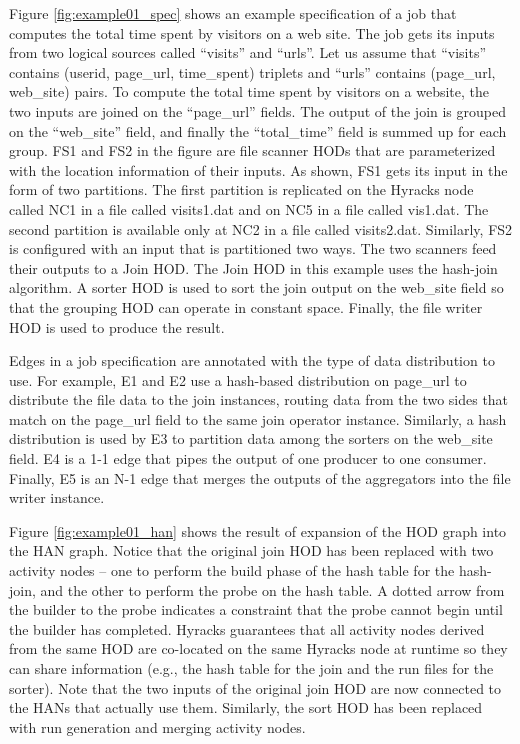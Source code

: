 {Figure \ref{fig:example01_spec} shows an example specification of a job that computes the total time spent by visitors on a web site. The job gets its inputs from two logical sources called ``visits'' and ``urls''. Let us assume that ``visits'' contains (userid, page\_url, time\_spent) triplets and ``urls'' contains (page\_url, web\_site) pairs. To compute the total time spent by visitors on a website, the two inputs are joined on the ``page\_url'' fields. The output of the join is grouped on the ``web\_site'' field, and finally the ``total\_time'' field is summed up for each group. FS1 and FS2 in the figure are file scanner HODs that are parameterized with the location information of their inputs. As shown, FS1 gets its input in the form of two partitions. The first partition is replicated on the Hyracks node called NC1 in a file called visits1.dat and on NC5 in a file called vis1.dat. The second partition is available only at NC2 in a file called visits2.dat. Similarly, FS2 is configured with an input that is partitioned two ways. The two scanners feed their outputs to a Join HOD. The Join HOD in this example uses the hash-join algorithm. A sorter HOD is used to sort the join output on the web\_site field so that the grouping HOD can operate in constant space. Finally, the file writer HOD is used to produce the result.

Edges in a job specification are annotated with the type of data distribution to use. For example, E1 and E2 use a hash-based distribution on page\_url to distribute the file data to the join instances, routing data from the two sides that match on the page\_url field to the same join operator instance. Similarly, a hash distribution is used by E3 to partition data among the sorters on the web\_site field. E4 is a 1-1 edge that pipes the output of one producer to one consumer. Finally, E5 is an N-1 edge that merges the outputs of the aggregators into the file writer instance.

Figure \ref{fig:example01_han} shows the result of expansion of the HOD graph into the HAN graph. Notice that the original join HOD has been replaced with two activity nodes -- one to perform the build phase of the hash table for the hash-join, and the other to perform the probe on the hash table. A dotted arrow from the builder to the probe indicates a constraint that the probe cannot begin until the builder has completed. Hyracks guarantees that all activity nodes derived from the same HOD are co-located on the same Hyracks node at runtime so they can share information (e.g., the hash table for the join and the run files for the sorter). Note that the two inputs of the original join HOD are now connected to the HANs that actually use them. Similarly, the sort HOD has been replaced with run generation and merging activity nodes.

}
